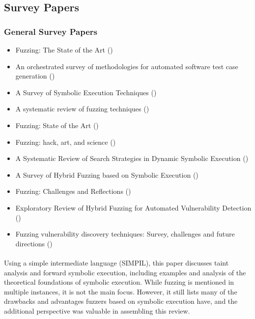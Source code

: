 \documentclass{article}
\begin{document}
\begin{multicols}{2}
    \subsection{Survey Papers}
    \subsubsection{General Survey Papers}
    \begin{itemize}
        \item    Fuzzing: The State of the Art ()\cite{FuzzingTheStateOfTheArt}
        \item    An orchestrated survey of methodologies for automated software test case generation ()\cite{Orchestrated}
        \item    A Survey of Symbolic Execution Techniques ()\cite{SurveySymbex}
        \item    A systematic review of fuzzing techniques ()\cite{Science}
        \item    Fuzzing: State of the Art ()\cite{FuzzingStateOfTheArt2018}
        \item    Fuzzing: hack, art, and science ()\cite{HackArtScience}
        \item    A Systematic Review of Search Strategies in Dynamic Symbolic Execution ()\cite{SearchStrategies}
        \item    A Survey of Hybrid Fuzzing based on Symbolic Execution ()\cite{SurveyHybrid}
        \item    Fuzzing: Challenges and Reflections ()\cite{ChallengesAndReflections}
        \item    Exploratory Review of Hybrid Fuzzing for Automated Vulnerability Detection ()\cite{Hybrid}
        \item    Fuzzing vulnerability discovery techniques: Survey, challenges and future directions ()\cite{FuzzingVulnerabilityDiscoveryTechniques}
    \end{itemize}

    \paragraph{}
    Using a simple intermediate language (SIMPIL), this paper discusses taint analysis and forward symbolic execution, including examples and analysis of the theoretical foundations of symbolic execution. While fuzzing is mentioned in multiple instances, it is not the main focus. However, it still lists many of the drawbacks and advantages fuzzers based on symbolic execution have, and the additional perspective was valuable in assembling this review.


\end{multicols}
\end{document}
